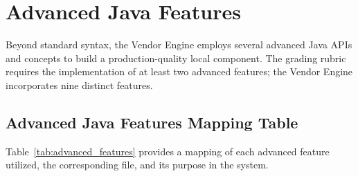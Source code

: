 
\section{Advanced Java Features}
\label{sec:advanced_java_features}

Beyond standard syntax, the Vendor Engine employs several advanced Java APIs and concepts to build a production-quality local component. The grading rubric requires the implementation of at least two advanced features; the Vendor Engine incorporates nine distinct features.

\subsection{Advanced Java Features Mapping Table}
Table~\ref{tab:advanced_features} provides a mapping of each advanced feature utilized, the corresponding file, and its purpose in the system.

